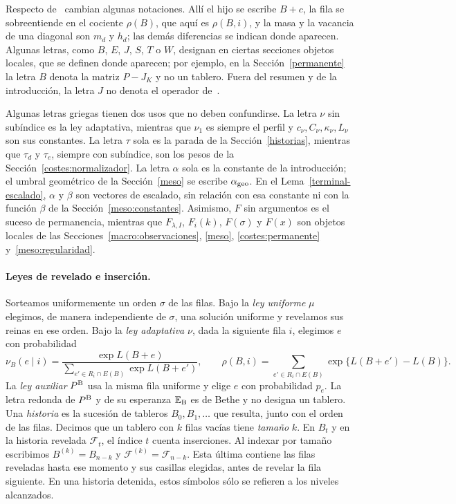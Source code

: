 Respecto de~\cite{pred} cambian algunas notaciones. Allí el hijo se escribe $B+c$, la fila se
sobreentiende en el cociente $\rho(B)$, que aquí es $\rho(B,i)$, y la masa y la vacancia de una
diagonal son $m_d$ y $h_d$; las demás diferencias se indican donde aparecen. Algunas letras, como $B$,
$E$, $J$, $S$, $T$ o $W$, designan en ciertas secciones objetos locales, que se definen donde aparecen;
por ejemplo, en la Sección~\ref{permanente} la letra $B$ denota la matriz $P-J_K$ y no un tablero.
Fuera del resumen y de la introducción, la letra $J$ no denota el operador de~\cite{pred}.

Algunas letras griegas tienen dos usos que no deben confundirse. La letra $\nu$ sin subíndice es la
ley adaptativa, mientras que $\nu_1$ es siempre el perfil y $c_\nu,C_\nu,\kappa_\nu,L_\nu$ son sus
constantes. La letra $\tau$ sola es la parada de la Sección~\ref{historias}, mientras que $\tau_d$ y
$\tau_e$, siempre con subíndice, son los pesos de la Sección~\ref{costes:normalizador}. La letra
$\alpha$ sola es la constante de la introducción; el umbral geométrico de la
Sección~\ref{meso} se escribe $\alpha_{\rm geo}$. En el Lema~\ref{terminal-escalado}, $\alpha$ y
$\beta$ son vectores de escalado, sin relación con esa constante ni con la función $\beta$ de la
Sección~\ref{meso:constantes}.
Asimismo, $F$ sin argumentos es el suceso de permanencia, mientras que $F_{\lambda,I}$, $F_i(k)$,
$F(\sigma)$ y $F(x)$ son objetos locales de las Secciones~\ref{macro:observaciones}, \ref{meso},
\ref{costes:permanente} y~\ref{meso:regularidad}.

\paragraph{Leyes de revelado e inserción.}
Sorteamos uniformemente un orden $\sigma$ de las filas. Bajo la \emph{ley uniforme} $\mu$ elegimos,
de manera independiente de $\sigma$, una solución uniforme y revelamos sus reinas en ese orden.
Bajo la \emph{ley adaptativa} $\nu$, dada la siguiente fila $i$, elegimos $e$ con probabilidad
\[
 \nu_B(e\mid i)=\frac{\exp L(B+e)}{\sum_{e'\in R_i\cap E(B)}\exp L(B+e')},\qquad
 \rho(B,i)=\sum_{e'\in R_i\cap E(B)}\exp\{L(B+e')-L(B)\}.
\]
La \emph{ley auxiliar} $P^{\rm B}$ usa la misma fila uniforme y elige $e$ con probabilidad $p_e$. La
letra redonda de $P^{\rm B}$ y de su esperanza $\mathbb{E}_{\rm B}$ es de Bethe y no designa un tablero. Una
\emph{historia} es la sucesión de tableros $B_0,B_1,\dots$ que resulta, junto con el orden de las
filas. Decimos que un tablero con $k$ filas vacías tiene \emph{tamaño} $k$. En $B_t$ y en la historia
revelada $\mathcal F_t$, el índice $t$ cuenta inserciones. Al indexar por tamaño escribimos
$B^{(k)}=B_{n-k}$ y $\mathcal F^{(k)}=\mathcal F_{n-k}$. Esta última contiene las filas reveladas
hasta ese momento y sus casillas elegidas, antes de revelar la fila siguiente. En una historia
detenida, estos símbolos sólo se refieren a los niveles alcanzados.
